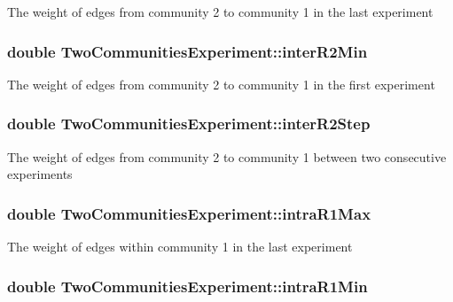 The weight of edges from community 2 to community 1 in the last experiment \hypertarget{class_two_communities_experiment_a2eeda95baf7cbc8acf89d66b460144f5}{
\subsubsection[{inter\-R2\-Min}]{\setlength{\rightskip}{0pt plus 5cm}double Two\-Communities\-Experiment\-::inter\-R2\-Min}}\label{class_two_communities_experiment_a2eeda95baf7cbc8acf89d66b460144f5}
The weight of edges from community 2 to community 1 in the first experiment \hypertarget{class_two_communities_experiment_aadc1e8bde8ba99c123d6deb62ef0024d}{
\subsubsection[{inter\-R2\-Step}]{\setlength{\rightskip}{0pt plus 5cm}double Two\-Communities\-Experiment\-::inter\-R2\-Step}}\label{class_two_communities_experiment_aadc1e8bde8ba99c123d6deb62ef0024d}
The weight of edges from community 2 to community 1 between two consecutive experiments \hypertarget{class_two_communities_experiment_adee272669c4b4e6c5e74a59efe2670f7}{
\subsubsection[{intra\-R1\-Max}]{\setlength{\rightskip}{0pt plus 5cm}double Two\-Communities\-Experiment\-::intra\-R1\-Max}}\label{class_two_communities_experiment_adee272669c4b4e6c5e74a59efe2670f7}
The weight of edges within community 1 in the last experiment \hypertarget{class_two_communities_experiment_a30d694b0b619d1a7e0e1d5f25076c6c4}{
\subsubsection[{intra\-R1\-Min}]{\setlength{\rightskip}{0pt plus 5cm}double Two\-Communities\-Experiment\-::intra\-R1\-Min}}\label{class_two_communities_experiment_a30d694b0b619d1a7e0e1d5f25076c6c4}
